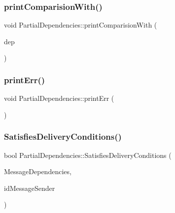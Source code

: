 \subsubsection{\texorpdfstring{print\+Comparision\+With()}{printComparisionWith()}}
{\footnotesize\ttfamily void Partial\+Dependencies\+::print\+Comparision\+With (\begin{DoxyParamCaption}\item[{const \hyperlink{class_partial_dependencies}{Partial\+Dependencies} \&}]{dep }\end{DoxyParamCaption})}

\mbox{\label{class_partial_dependencies_ac4c98e7d381b9e9efa54a094d1da729d}} 
\subsubsection{\texorpdfstring{print\+Err()}{printErr()}}
{\footnotesize\ttfamily void Partial\+Dependencies\+::print\+Err (\begin{DoxyParamCaption}{ }\end{DoxyParamCaption})}

\mbox{\label{class_partial_dependencies_a67a733dba9069541f83fecee520ccce1}} 
\subsubsection{\texorpdfstring{Satisfies\+Delivery\+Conditions()}{SatisfiesDeliveryConditions()}}
{\footnotesize\ttfamily bool Partial\+Dependencies\+::\+Satisfies\+Delivery\+Conditions (\begin{DoxyParamCaption}\item[{const \hyperlink{class_partial_dependencies}{Partial\+Dependencies} \&}]{Message\+Dependencies,  }\item[{unsigned int}]{id\+Message\+Sender }\end{DoxyParamCaption})}

\mbox{\label{class_partial_dependencies_ad60f5e87d6d7e027c399bd1a8206a952}} 
